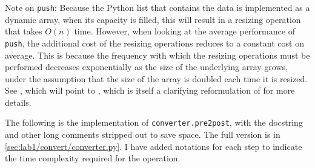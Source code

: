 \documentclass[10pt,letterpaper,final]{report}
\begin{document}
Note on \texttt{push}: Because the Python list that contains the data is implemented as a dynamic array, when its capacity is filled, this will result in a resizing operation that takes $O(n)$ time. However, when looking at the average performance of \texttt{push}, the additional cost of the resizing operations reduces to a constant cost on average. This is because the frequency with which the resizing operations must be performed decreases exponentially as the size of the underlying array grows, under the assumption that the size of the array is doubled each time it is resized. See \textcite{EnWikipediaorgAmortizedAnalysis}, which will point to \textcite{Kozen2011CornellLectureAmortizedAnalysis}, which is itself a clarifying reformulation of \textcite{Tarjan1985AmortizedComputationalComplexity} for more details.


The following is the implementation of \texttt{converter.pre2post}, with the docstring and other long comments stripped out to save space. The full version is in \autoref{sec:lab1/convert/converter.py}. I have added notations for each step to indicate the time complexity required for the operation.
\end{document}
